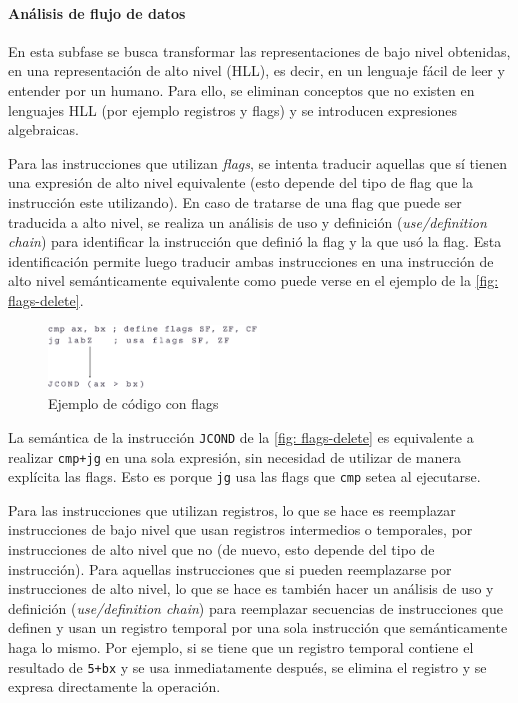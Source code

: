 \documentclass[runningheads]{llncs}
\begin{document}
\paragraph{Análisis de flujo de datos} En esta subfase se busca transformar las representaciones 
de bajo nivel obtenidas, en una representación de alto nivel (HLL), es decir, en un lenguaje 
fácil de leer y entender por un humano. Para ello, se eliminan conceptos que no existen en 
lenguajes HLL (por ejemplo registros y flags) y se introducen expresiones algebraicas.

Para las instrucciones que utilizan \textit{flags}, se intenta traducir aquellas que sí tienen 
una expresión de alto nivel equivalente (esto depende del tipo de flag que la instrucción este utilizando).
En caso de tratarse de una flag que puede ser traducida a alto nivel, se realiza un análisis de uso 
y definición (\textit{use/definition chain}) para identificar la instrucción que definió la flag y 
la que usó la flag. Esta identificación permite luego traducir ambas instrucciones en una instrucción de 
alto nivel semánticamente equivalente como puede verse en el ejemplo de la \autoref{fig: flags-delete}.

\begin{figure}
  \vspace{-15pt}
  \centering
  \includegraphics[width=0.5\textwidth]{flags-delete.png}
  \caption{Ejemplo de código con flags}
  \label{fig: flags-delete}
  \vspace{-15pt}
\end{figure}

La semántica de la instrucción \verb|JCOND| de la \autoref{fig: flags-delete} es equivalente a realizar 
\verb|cmp+jg| en una sola expresión, sin necesidad de utilizar de manera explícita las flags. 
Esto es porque \verb|jg| usa las flags que \verb|cmp| setea al ejecutarse.

Para las instrucciones que utilizan registros, lo que se hace es reemplazar instrucciones de bajo 
nivel que usan registros intermedios o temporales, por instrucciones de alto nivel que no (de nuevo,
esto depende del tipo de instrucción). Para aquellas instrucciones que si pueden reemplazarse por 
instrucciones de alto nivel, lo que se hace es también hacer un análisis de uso y definición 
(\textit{use/definition chain}) para reemplazar secuencias de instrucciones que definen y usan un 
registro temporal por una sola instrucción que semánticamente haga lo mismo. 
Por ejemplo, si se tiene que un registro temporal contiene el resultado de \verb|5+bx| y se 
usa inmediatamente después, se elimina el registro y se expresa directamente la operación.
\end{document}
